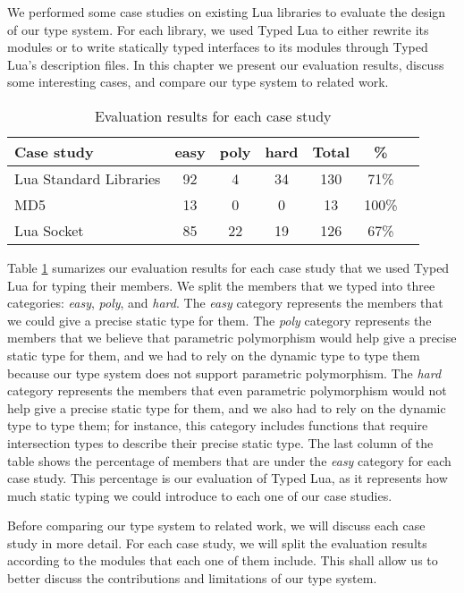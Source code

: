 
We performed some case studies on existing Lua libraries
to evaluate the design of our type system.
For each library, we used Typed Lua to either rewrite its modules
or to write statically typed interfaces to its modules through
Typed Lua's description files.
In this chapter we present our evaluation results, discuss
some interesting cases, and compare our type system to
related work.

\begin{table}[!ht]
\begin{center}
\begin{tabular}{|l|c|c|c|c|c|c|}
\hline
\textbf{Case study} & \textbf{easy} & \textbf{poly} & \textbf{hard} & \textbf{Total} & \textbf{\%} \\
\hline
Lua Standard Libraries & 92 & 4 & 34 & 130 & 71\% \\
\hline
MD5 & 13 & 0 & 0 & 13 & 100\% \\
\hline
Lua Socket & 85 & 22 & 19 & 126 & 67\% \\
\hline
\end{tabular}
\end{center}
\caption{Evaluation results for each case study}
\label{tab:evalbycase}
\end{table}

Table \ref{tab:evalbycase} sumarizes our evaluation results for each
case study that we used Typed Lua for typing their members.
We split the members that we typed into three categories:
\emph{easy}, \emph{poly}, and \emph{hard}.
The \emph{easy} category represents the members that we could give
a precise static type for them.
The \emph{poly} category represents the members that we believe that
parametric polymorphism would help give a precise static type for them,
and we had to rely on the dynamic type to type them because our
type system does not support parametric polymorphism.
The \emph{hard} category represents the members that even parametric
polymorphism would not help give a precise static type for them,
and we also had to rely on the dynamic type to type them;
for instance, this category includes functions that require
intersection types to describe their precise static type.
The last column of the table shows the percentage of members that
are under the \emph{easy} category for each case study.
This percentage is our evaluation of Typed Lua, as it
represents how much static typing we could introduce to each one of
our case studies.

Before comparing our type system to related work, we will discuss
each case study in more detail.
For each case study, we will split the evaluation results according
to the modules that each one of them include.
This shall allow us to better discuss the contributions and limitations
of our type system.

